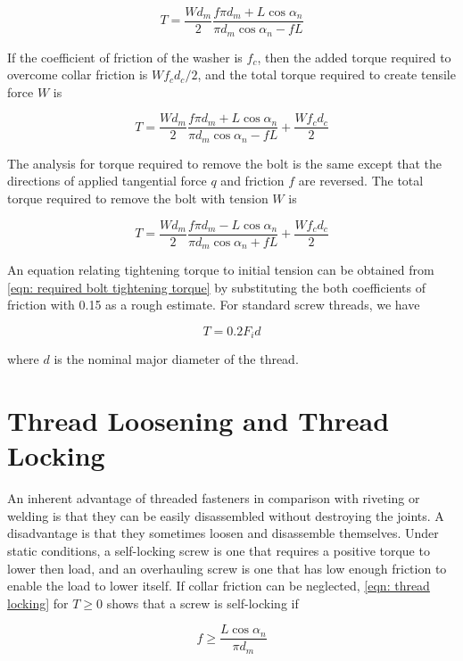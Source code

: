 \documentclass[
10pt,
a4paper,
openany,
svgnames,
]{book}
\begin{document}
\[T = \frac{Wd_m}{2}\frac{f\pi d_m + L\cos \alpha_n}{\pi d_m\cos \alpha_n - fL}\]

If the coefficient of friction of the washer is $f_c$, then the added torque required to overcome collar friction is $Wf_cd_c/2$, and the total torque required to create tensile force $W$ is

\begin{equation} \label{eqn: required bolt tightening torque}
  T = \frac{Wd_m}{2}\frac{f\pi d_m + L\cos \alpha_n}{\pi d_m\cos \alpha_n - fL} + \frac{Wf_cd_c}{2}
\end{equation}

The analysis for torque required to remove the bolt is the same except that the directions of applied tangential force $q$ and friction $f$ are reversed. The total torque required to remove the bolt with tension $W$ is

\[T = \frac{Wd_m}{2}\frac{f\pi d_m - L\cos \alpha_n}{\pi d_m\cos \alpha_n + fL} + \frac{Wf_cd_c}{2}\]

An equation relating tightening torque to initial tension can be obtained from \cref{eqn: required bolt tightening torque} by substituting the both coefficients of friction with 0.15 as a rough estimate. For standard screw threads, we have

\begin{equation}
  T = 0.2F_id
\end{equation}

where $d$ is the nominal major diameter of the thread.

\section{Thread Loosening and Thread Locking}

An inherent advantage of threaded fasteners in comparison with riveting or welding is that they can be easily disassembled without destroying the joints. A disadvantage is that they sometimes loosen and disassemble themselves.
Under static conditions, a self-locking screw is one that requires a positive torque to lower then load, and an overhauling screw is one that has low enough friction to enable the load to lower itself. If collar friction can be neglected, \cref{eqn: thread locking} for $T \geqslant 0$ shows that a screw is self-locking if

\begin{equation} \label{eqn: thread locking}
  f \geqslant \frac{L\cos \alpha_n}{\pi d_m}
\end{equation}
\end{document}
